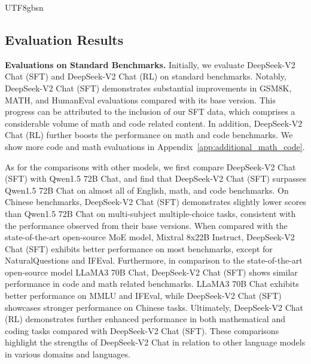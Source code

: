 \documentclass[11pt, a4paper, logo, copyright, nonumbering]{deepseek}
\newcommand{\dsvii}{DeepSeek-V2}
\newcommand{\dsviisft}{DeepSeek-V2 Chat (SFT)}
\newcommand{\dsviirl}{DeepSeek-V2 Chat (RL)}
\begin{document}
\begin{CJK*}{UTF8}{gbsn}
\subsection{Evaluation Results}

\textbf{Evaluations on Standard Benchmarks.}
Initially, we evaluate \dsviisft{} and \dsviirl{} on standard benchmarks. 
Notably, \dsviisft{} demonstrates substantial improvements in GSM8K, MATH, and HumanEval evaluations compared with its base version. 
This progress can be attributed to the inclusion of our SFT data, which comprises a considerable volume of math and code related content. 
In addition, \dsviirl{} further boosts the performance on math and code benchmarks. 
We show more code and math evaluations in Appendix~\ref{app:additional_math_code}. 

As for the comparisons with other models, we first compare \dsviisft{} with Qwen1.5 72B Chat, and find that \dsviisft{} surpasses Qwen1.5 72B Chat on almost all of English, math, and code benchmarks. 
On Chinese benchmarks, \dsviisft{} demonstrates slightly lower scores than Qwen1.5 72B Chat on multi-subject multiple-choice tasks, consistent with the performance observed from their base versions.
When compared with the state-of-the-art open-source MoE model, Mixtral 8x22B Instruct, \dsviisft{} exhibits better performance on most benchmarks, except for NaturalQuestions and IFEval. 
Furthermore, in comparison to the state-of-the-art open-source model LLaMA3 70B Chat, \dsviisft{} shows similar performance in code and math related benchmarks. 
LLaMA3 70B Chat exhibits better performance on MMLU and IFEval, while \dsviisft{} showcases stronger performance on Chinese tasks. 
Ultimately, \dsviirl{} demonstrates further enhanced performance in both mathematical and coding tasks compared with \dsviisft{}.
These comparisons highlight the strengths of \dsvii{} Chat in relation to other language models in various domains and languages.


\end{CJK*}
\end{document}
